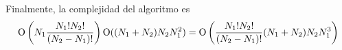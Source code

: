 Finalmente, la complejidad del algoritmo es
\[
\operatorname{O}\left(N_1 \frac{N_1!  N_2!}{(N_2 - N_1)!}\right) \operatorname{O}((N_1 + N_2)  N_2  N_1^2) =
\operatorname{O}\left(\frac{N_1!  N_2!}{(N_2 - N_1)!} (N_1 + N_2)  N_2  N_1^3\right)
\]


